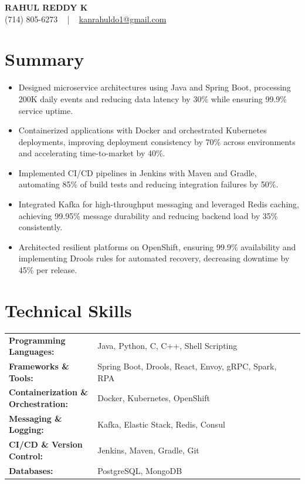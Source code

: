 \documentclass[letterpaper,11pt]{article}
\newcommand{\resumeItem}[1]{
  \item\footnotesize{
    {#1 \vspace{-2pt}}
  }
}
\newcommand{\resumeItemListStart}{\begin{itemize}[leftmargin=*]}
\newcommand{\resumeItemListEnd}{\end{itemize}\vspace{-5pt}}
\begin{document}
\begin{center}
    {\fontsize{14pt}{12pt}\selectfont \textbf{\MakeUppercase{Rahul Reddy K}}}\\ \vspace{2pt}
    \fontsize{10pt}{12pt}\selectfont (714) 805-6273 ~ | ~ \href{mailto:kanrahuldo1@gmail.com}{kanrahuldo1@gmail.com}~
    \vspace{-8pt}
\end{center}

\section{Summary}
\fontsize{9pt}{10pt}\selectfont
\resumeItemListStart
    \resumeItem{Designed microservice architectures using Java and Spring Boot, processing 200K daily events and reducing data latency by 30\% while ensuring 99.9\% service uptime.}
    \resumeItem{Containerized applications with Docker and orchestrated Kubernetes deployments, improving deployment consistency by 70\% across environments and accelerating time-to-market by 40\%.}
    \resumeItem{Implemented CI/CD pipelines in Jenkins with Maven and Gradle, automating 85\% of build tests and reducing integration failures by 50\%.}
    \resumeItem{Integrated Kafka for high-throughput messaging and leveraged Redis caching, achieving 99.95\% message durability and reducing backend load by 35\% consistently.}
    \resumeItem{Architected resilient platforms on OpenShift, ensuring 99.9\% availability and implementing Drools rules for automated recovery, decreasing downtime by 45\% per release.}
\resumeItemListEnd
\vspace{-6pt}

\section{Technical Skills}
        \vspace{-14pt}
        \begin{table}[h]
            \fontsize{9pt}{10pt}\selectfont
            \begin{tabular}{p{0.3\linewidth} p{0.7\linewidth}}
                \textbf{Programming Languages:} & Java, Python, C, C++, Shell Scripting \\
                \textbf{Frameworks \& Tools:} & Spring Boot, Drools, React, Envoy, gRPC, Spark, RPA \\
                \textbf{Containerization \& Orchestration:} & Docker, Kubernetes, OpenShift \\
                \textbf{Messaging \& Logging:} & Kafka, Elastic Stack, Redis, Consul \\
                \textbf{CI/CD \& Version Control:} & Jenkins, Maven, Gradle, Git \\
                \textbf{Databases:} & PostgreSQL, MongoDB \\
            \end{tabular}
        \end{table}
    \vspace{-15pt}
\end{document}
